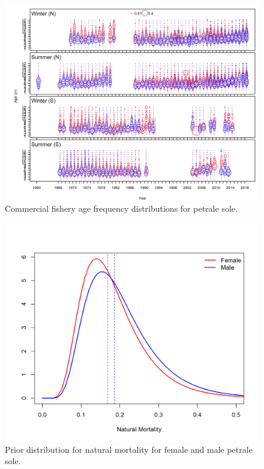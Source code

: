 \documentclass[12pt,]{article}
\begin{document}
\FloatBarrier

\begin{figure}
\centering
\includegraphics{r4ss/plots_mod1/comp_agedat__multi-fleet_comparison.png}
\caption{Commercial fishery age frequency distributions for petrale
sole. \label{fig:comm_ages}}
\end{figure}

\FloatBarrier

\begin{figure}
\centering
\includegraphics{Figures/M_prior.png}
\caption{Prior distribution for natural mortality for female and male
petrale sole. \label{fig:m_prior}}
\end{figure}
\end{document}
